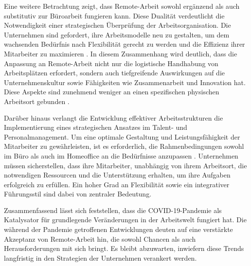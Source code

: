 Eine weitere Betrachtung zeigt, dass Remote-Arbeit sowohl ergänzend als auch substitutiv zur Büroarbeit fungieren kann. Diese Dualität verdeutlicht die Notwendigkeit einer strategischen Überprüfung der Arbeitsorganisation. Die Unternehmen sind gefordert, ihre Arbeitsmodelle neu zu gestalten, um dem wachsenden Bedürfnis nach Flexibilität gerecht zu werden und die Effizienz ihrer Mitarbeiter zu maximieren \cite{file2}. In diesem Zusammenhang wird deutlich, dass die Anpassung an Remote-Arbeit nicht nur die logistische Handhabung von Arbeitsplätzen erfordert, sondern auch tiefgreifende Auswirkungen auf die Unternehmenskultur sowie Fähigkeiten wie Zusammenarbeit und Innovation hat. Diese Aspekte sind zunehmend weniger an einen spezifischen physischen Arbeitsort gebunden \cite{7}.

Darüber hinaus verlangt die Entwicklung effektiver Arbeitsstrukturen die Implementierung eines strategischen Ansatzes im Talent- und Personalmanagement. Um eine optimale Gestaltung und Leistungsfähigkeit der Mitarbeiter zu gewährleisten, ist es erforderlich, die Rahmenbedingungen sowohl im Büro als auch im Homeoffice an die Bedürfnisse anzupassen \cite{7}. Unternehmen müssen sicherstellen, dass ihre Mitarbeiter, unabhängig von ihrem Arbeitsort, die notwendigen Ressourcen und die Unterstützung erhalten, um ihre Aufgaben erfolgreich zu erfüllen. Ein hoher Grad an Flexibilität sowie ein integrativer Führungsstil sind dabei von zentraler Bedeutung.

Zusammenfassend lässt sich feststellen, dass die COVID-19-Pandemie als Katalysator für grundlegende Veränderungen in der Arbeitswelt fungiert hat. Die während der Pandemie getroffenen Entwicklungen deuten auf eine verstärkte Akzeptanz von Remote-Arbeit hin, die sowohl Chancen als auch Herausforderungen mit sich bringt. Es bleibt abzuwarten, inwiefern diese Trends langfristig in den Strategien der Unternehmen verankert werden.